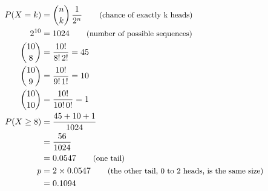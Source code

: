 \begin{align*}
P(X = k) &= \binom{n}{k}\,\frac{1}{2^{n}} \qquad \text{\small (chance of exactly k heads)} \\
2^{10} &= 1024 \qquad \text{\small (number of possible sequences)} \\
\binom{10}{8} &= \frac{10!}{8!\,2!} = 45 \\
\binom{10}{9} &= \frac{10!}{9!\,1!} = 10 \\
\binom{10}{10} &= \frac{10!}{10!\,0!} = 1 \\
P(X \ge 8) &= \frac{45 + 10 + 1}{1024} \\
 &= \frac{56}{1024} \\
 &= 0.0547 \qquad \text{\small (one tail)} \\
p &= 2 \times 0.0547 \qquad \text{\small (the other tail, 0 to 2 heads, is the same size)} \\
 &= 0.1094
\end{align*}
